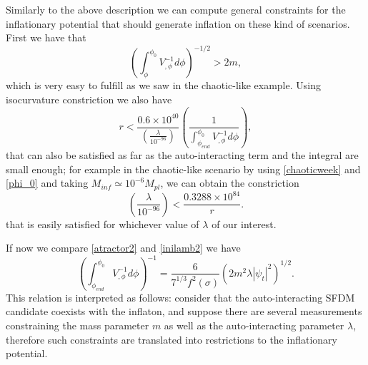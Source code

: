 \documentclass[amssymb,twocolumn,prd,nofootinbib,showpacs]{revtex4-1}
\begin{document}
Similarly to the above description we can compute general constraints for the inflationary 
potential that should generate inflation on these kind of scenarios. First we have that
%
\begin{equation}
\left(\int^{\phi_0}_\phi V_{,\phi}^{-1}d\phi\right)^{-1/2}>2m,
\end{equation}
%
which is very easy to fulfill as we saw in the chaotic-like example. Using isocurvature constriction we also have
%
\begin{equation}
r<\frac{0.6\times 10^{40}}{\left(\frac{\lambda}{10^{-96}}\right)}\left(\frac{1}{\int_{\phi_{end}}^{\phi_0}V_{,\phi}^{-1}d\phi}\right),
\end{equation}
%
that can also be satisfied as far as the auto-interacting term and the integral are small enough; 
for example in the chaotic-like scenario by using \eqref{chaoticweek} and \eqref{phi_0}
and taking $M_{inf}\simeq 10^{-6}M_{pl} $, we can obtain the constriction 
%
\begin{equation}
\left(\frac{\lambda}{10^{-96}}\right)<\frac{0.3288\times 10^{84}}{r}.
\end{equation}
that is easily satisfied for whichever value of $\lambda$ of our interest.

%
If now we compare \eqref{atractor2} and \eqref{inilamb2} we have
%
\begin{equation}\label{inilamb3}
\left(\int_{\phi_{end}}^{\phi_0}V^{-1}_{,\phi}d\phi\right)^{-1}=\frac{6}{7^{1/3}f^2(\sigma)}\left(2m^2\lambda|\psi_t|^2\right)^{1/2}.
\end{equation}
This relation is interpreted as follows: consider that the auto-interacting SFDM candidate 
coexists with the inflaton, and suppose there are several measurements constraining the mass 
parameter $m$ as well as the auto-interacting parameter $\lambda$, therefore such constraints are translated into 
restrictions to the inflationary potential.  
\end{document}
